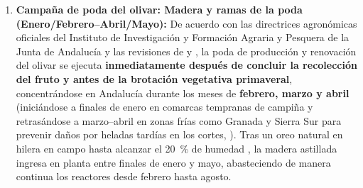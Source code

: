 \documentclass{report}
\begin{document}
\begin{enumerate}
    \item \textbf{Campaña de poda del olivar: Madera y ramas de la poda (Enero/Febrero--Abril/Mayo):} De acuerdo con las directrices agronómicas oficiales del Instituto de Investigación y Formación Agraria y Pesquera de la Junta de Andalucía \autocite{PerezMohedano2020} y las revisiones de \textcite{RomeroGarcia2014} y \textcite[Sección~2.1.1]{Jafari-Gohargan2026}, la poda de producción y renovación del olivar se ejecuta \textbf{inmediatamente después de concluir la recolección del fruto y antes de la brotación vegetativa primaveral}, concentrándose en Andalucía durante los meses de \textbf{febrero, marzo y abril} (iniciándose a finales de enero en comarcas tempranas de campiña y retrasándose a marzo--abril en zonas frías como Granada y Sierra Sur para prevenir daños por heladas tardías en los cortes, \textcite{PerezMohedano2020}). Tras un oreo natural en hilera en campo hasta alcanzar el \SI{20}{\percent} de humedad \autocite[Sección~5.5]{CAP2008}, la madera astillada ingresa en planta entre finales de enero y mayo, abasteciendo de manera continua los reactores desde febrero hasta agosto.
\end{enumerate}
\end{document}
